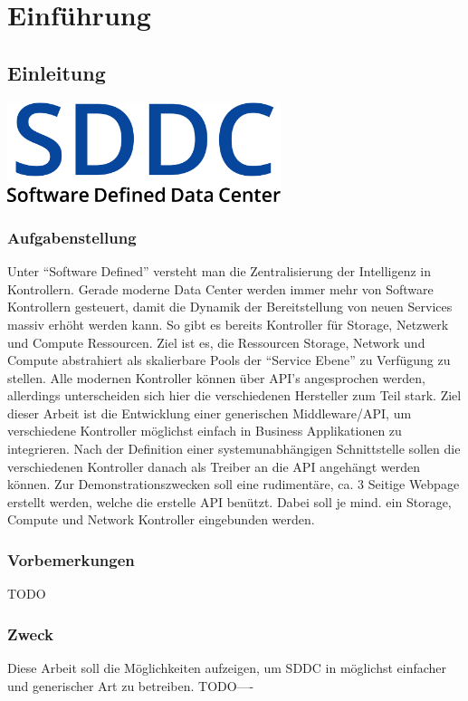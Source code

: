 \part{Einführung}
\chapter{Einleitung}
\begin{center}
  \includegraphics[width=0.6\textwidth]{./22_Grafiken/01_Logo/SDDC}
\end{center}

\section{Aufgabenstellung}

Unter ``Software Defined'' versteht man die Zentralisierung der Intelligenz in Kontrollern. 
Gerade moderne Data Center werden immer mehr von Software Kontrollern gesteuert, 
damit die Dynamik der Bereitstellung von neuen Services massiv erhöht werden kann. 
So gibt es bereits Kontroller für Storage, Netzwerk und Compute Ressourcen. 
\newline
Ziel ist es, die Ressourcen Storage, Network und Compute abstrahiert als skalierbare Pools der 
``Service Ebene'' zu Verfügung zu stellen. Alle modernen Kontroller können über API's 
angesprochen werden, allerdings unterscheiden sich hier die verschiedenen Hersteller zum Teil stark.
\newline
Ziel dieser Arbeit ist die Entwicklung einer generischen Middleware/API, um verschiedene Kontroller 
möglichst einfach in Business Applikationen zu integrieren. Nach der Definition einer systemunabhängigen 
Schnittstelle sollen die verschiedenen Kontroller danach als Treiber an die API angehängt werden können. 
Zur Demonstrationszwecken soll eine rudimentäre, ca. 3 Seitige Webpage erstellt werden, welche die erstelle 
API benützt. Dabei soll je mind. ein Storage, Compute und Network Kontroller eingebunden werden.

\section{Vorbemerkungen}
TODO
\section{Zweck}
Diese Arbeit soll die Möglichkeiten aufzeigen, um \ac{SDDC} in möglichst einfacher 
und generischer Art zu betreiben.
TODO----
